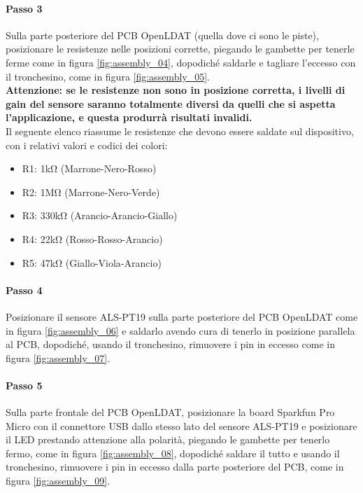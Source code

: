 \paragraph{Passo 3} Sulla parte posteriore del PCB OpenLDAT (quella dove ci sono le piste), posizionare le resistenze nelle posizioni corrette, piegando le gambette per tenerle ferme come in figura \ref{fig:assembly_04}, dopodiché saldarle e tagliare l'eccesso con il tronchesino, come in figura \ref{fig:assembly_05}.\\
\textbf{Attenzione: se le resistenze non sono in posizione corretta, i livelli di gain del sensore saranno totalmente diversi da quelli che si aspetta l'applicazione, e questa produrrà risultati invalidi.}\\
Il seguente elenco riassume le resistenze che devono essere saldate sul dispositivo, con i relativi valori e codici dei colori:
\begin{itemize}
	\item R1: 1k\si{\ohm} (Marrone-Nero-Rosso)
	\item R2: 1M\si{\ohm} (Marrone-Nero-Verde)
	\item R3: 330k\si{\ohm} (Arancio-Arancio-Giallo)
	\item R4: 22k\si{\ohm} (Rosso-Rosso-Arancio)
	\item R5: 47k\si{\ohm} (Giallo-Viola-Arancio)
\end{itemize}

\paragraph{Passo 4} Posizionare il sensore ALS-PT19 sulla parte posteriore del PCB OpenLDAT come in figura \ref{fig:assembly_06} e saldarlo avendo cura di tenerlo in posizione parallela al PCB, dopodiché, usando il tronchesino, rimuovere i pin in eccesso come in figura \ref{fig:assembly_07}.

\paragraph{Passo 5} Sulla parte frontale del PCB OpenLDAT, posizionare la board Sparkfun Pro Micro con il connettore USB dallo stesso lato del sensore ALS-PT19 e posizionare il LED prestando attenzione alla polarità, piegando le gambette per tenerlo fermo, come in figura \ref{fig:assembly_08}, dopodiché saldare il tutto e usando il tronchesino, rimuovere i pin in eccesso dalla parte posteriore del PCB, come in figura \ref{fig:assembly_09}.

